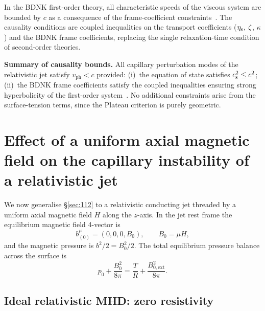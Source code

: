 In the BDNK first-order theory, all characteristic speeds of the
viscous system are bounded by $c$ as a consequence of the
frame-coefficient constraints~\cite{BemficaDNK2023,HoultKovtun2020}.  The
causality conditions are coupled inequalities on the transport
coefficients ($\eta_{\mathrm{s}}$, $\zeta$, $\kappa$) and the BDNK frame
coefficients, replacing the single relaxation-time condition of
second-order theories.

\begin{relcorrection}
\textbf{Summary of causality bounds.}
All capillary perturbation modes of the relativistic jet satisfy
$v_{\mathrm{ph}} < c$ provided:
(i)~the equation of state satisfies $c_{\mathrm{s}}^{2} \leq c^{2}$;
(ii)~the BDNK frame coefficients satisfy the coupled inequalities
ensuring strong hyperbolicity of the first-order
system~\cite{BemficaDNK2023}.
No additional constraints arise from the surface-tension terms, since
the Plateau criterion is purely geometric.
\end{relcorrection}


\section{Effect of a uniform axial magnetic field on the capillary
instability of a relativistic jet}
\label{sec:rel-112}

We now generalise \S\ref{sec:112} to a relativistic conducting jet
threaded by a uniform axial magnetic field $H$ along the $z$-axis.
In the jet rest frame the equilibrium magnetic field 4-vector is
\begin{equation}
\label{eq:rel-112-b0}
b^{\mu}_{(0)} = (0, 0, 0, B_{0}),
\qquad
B_{0} = \mu H,
\end{equation}
and the magnetic pressure is $b^{2}/2 = B_{0}^{2}/2$.  The total
equilibrium pressure balance across the surface is
\begin{equation}
\label{eq:rel-112-equil}
p_{0} + \frac{B_{0}^{2}}{8\pi} = \frac{T}{R}
  + \frac{B_{0,\mathrm{ext}}^{2}}{8\pi}.
\end{equation}

\subsection{Ideal relativistic MHD: zero resistivity}
\label{sec:rel-112-ideal}

